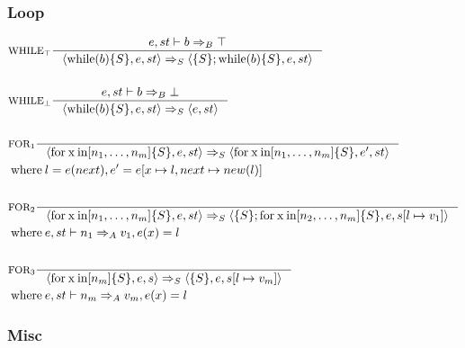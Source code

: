 \subsubsection{Loop}
\newcommand{\Tfor}{\mathbin{\text{for}}}
\newcommand{\Tx}{\mathbin{\text{x}}}
\newcommand{\Tin}{\mathbin{\text{in}}}
\newcommand{\Twhile}{\mathbin{\text{while}}}

\begin{align*}
&\inference[$\text{WHILE}_\top$]{e,st \vdash b \Rightarrow_B \top}
                       {\Braket{\Twhile(b)\{S\},e,st} \Rightarrow_S \Braket{\{S\}; \Twhile (b)\{S\},e,st}}
\\\\
&\inference[$\text{WHILE}_\bot$]{e,st \vdash b \Rightarrow_B \bot}
                       {\Braket{\Twhile(b)\{S\},e,st} \Rightarrow_S \Braket{e,st}}
\\\\
&\inference[$\text{FOR}_1$]{}
                       {\Braket{\Tfor \Tx \Tin [n_1,\dots,n_m]\{S\},e,st} \Rightarrow_S \Braket{\Tfor \mathbin{\text{x}} \mathbin{\text{in}} [n_1,\dots,n_m]\{S\},e',st}}
\\
&\mathbin{\text{where}} l = e(next), e' = e[x\mapsto l,next\mapsto new(l)]
\\\\
&\inference[$\text{FOR}_2$]{}
                       {\Braket{\Tfor \Tx \Tin [n_1,\dots,n_m]\{S\},e,st} \Rightarrow_S \Braket{\{S\}; \Tfor \mathbin{\text{x}} \mathbin{\text{in}} [n_2,\dots,n_m]\{S\},e,s[l\mapsto v_1]}}
\\
&\mathbin{\text{where}} e,st \vdash n_1 \Rightarrow_A v_1,e(x)=l
\\\\
&\inference[$\text{FOR}_3$]{}
                       {\Braket{\Tfor \mathbin{\text{x}} \mathbin{\text{in}} [n_m]\{S\},e,s} \Rightarrow_S \Braket{\{S\},e,s[l\mapsto v_m]}}
\\
&\mathbin{\text{where}} e,st \vdash n_m \Rightarrow_A v_m,e(x)=l
\end{align*}

\subsubsection{Misc}
\begin{align*}

\end{align*}